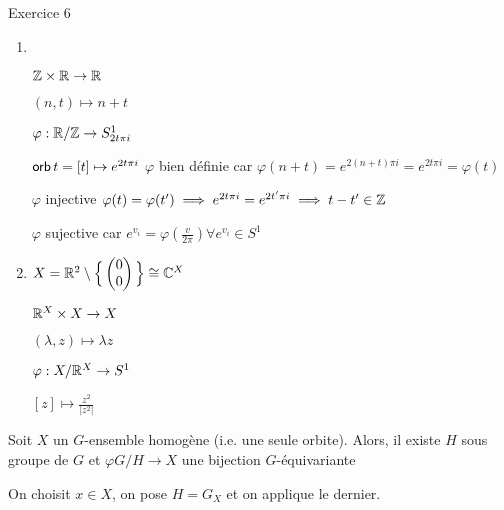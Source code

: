 \documentclass[french,a4paper,10pt]{article}
\begin{document}
	\begin{td-exo}
		Exercice 6
	\end{td-exo}
	\begin{td-sol}
		\begin{enumerate}[label=$(\roman*)$]
			\item\,
			
			$\mathbb{Z} \times \mathbb{R}\to \mathbb{R}$
			
			$(n,t) \mapsto n+t$ 
			
			$\varphi : \mathbb{R}/\mathbb{Z} \to S^1_{2t\pi i}$
			
			$\operatorname{\mathsf{orb}} t = [t] \mapsto e^{2t\pi i}$
			$\varphi$ bien définie car $\varphi(n+t) = e^{2(n+t)\pi i} = 
			e^{2t\pi i} = \varphi(t)$
			
			$\varphi$ injective $\varphi(t) = \varphi(t') \implies e^{2t\pi i} = 
			e^{2t'\pi i} \implies t - t'\in\mathbb{Z}$
			
			$\varphi$ sujective car $e^{v_i} = \varphi(\frac{v}{2\pi}) \forall e^{v_i}\in S^1$
			
			\item $X = \mathbb{R}^2\setminus \Big\{\begin{pmatrix}
				0 \\ 0
			\end{pmatrix}\Big\} \cong \mathbb{C}^{X}$
			
			$\mathbb{R}^X \times X \to X$ 
			
			$(\lambda, z) \mapsto \lambda z$
			
			$\varphi: X/\mathbb{R}^X \to S^1$
			
			$[z] \mapsto \frac{z^2}{|z^2|}$
		\end{enumerate}
	\end{td-sol}

	\begin{corollaire}
		Soit $X$ un $G$-ensemble homogène (i.e. une seule orbite). Alors, il existe $H$ sous groupe de $G$ et $\varphi G/H\to X$ une bijection $G$-équivariante
	\end{corollaire}

	\begin{myproof}
		On choisit $x\in X$, on pose $H=G_X$ et on applique le dernier.
	\end{myproof}
\end{document}
